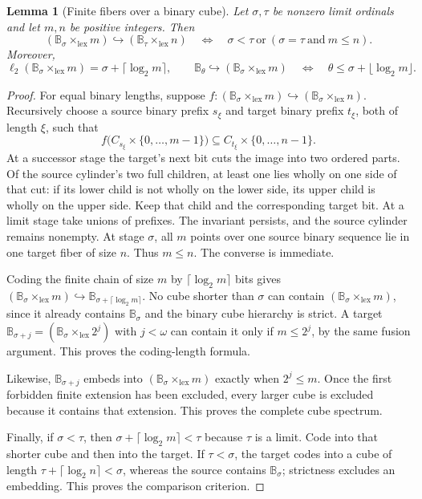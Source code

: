 \documentclass[11pt]{article}
\newtheorem{lemma}[lemma]{Lemma}
\theoremstyle{definition}
\theoremstyle{remark}
\newcommand{\B}{\mathbb B}
\newcommand{\lex}{\mathrm{lex}}
\newcommand{\bl}{\ell_2}
\newcommand{\emb}{\hookrightarrow}
\begin{document}
\begin{lemma}[Finite fibers over a binary cube]
\label{swo:cb:new:lem:finite-capacity}
Let $\sigma,\tau$ be nonzero limit ordinals and let $m,n$ be positive
integers.  Then
\[
 (\B_{\sigma}\times_{\lex}m)\emb (\B_{\tau}\times_{\lex}n)
 \quad\Longleftrightarrow\quad
 \sigma<\tau\ \text{or}\
      (\sigma=\tau\ \text{and}\ m\leq n).
\]
Moreover,
\[
 \bl(\B_{\sigma}\times_{\lex}m)=\sigma+\lceil\log_2m\rceil,
 \qquad
 \B_\theta\emb (\B_{\sigma}\times_{\lex}m)
 \quad\Longleftrightarrow\quad
 \theta\leq\sigma+\lfloor\log_2m\rfloor.
\]
\end{lemma}
\begin{proof}
For equal binary lengths, suppose
$f:(\B_{\sigma}\times_{\lex}m)\emb (\B_{\sigma}\times_{\lex}n)$.  Recursively choose a source
binary prefix $s_\xi$ and target binary prefix $t_\xi$, both of
length $\xi$, such that
\[
 f\bigl(C_{s_\xi}\times\{0,\ldots,m-1\}\bigr)
     \subseteq C_{t_\xi}\times\{0,\ldots,n-1\}.
\]
At a successor stage the target's next bit cuts the image into two
ordered parts.  Of the source cylinder's two full children, at least
one lies wholly on one side of that cut: if its lower child is not
wholly on the lower side, its upper child is wholly on the upper side.
Keep that child and the corresponding target bit.  At a limit stage
take unions of prefixes.  The invariant persists, and the source
cylinder remains nonempty.  At stage $\sigma$, all $m$ points over
one source binary sequence lie in one target fiber of size $n$.
Thus $m\leq n$.  The converse is immediate.

Coding the finite chain of size $m$ by
$\lceil\log_2m\rceil$ bits gives
$(\B_{\sigma}\times_{\lex}m)\emb\B_{\sigma+\lceil\log_2m\rceil}$.
No cube shorter than $\sigma$ can contain $(\B_{\sigma}\times_{\lex}m)$, since it
already contains $\B_\sigma$ and the binary cube hierarchy is
strict.  A target $\B_{\sigma+j}=(\B_{\sigma}\times_{\lex}2^j)$ with $j<\omega$
can contain it only if $m\leq2^j$, by the same fusion argument.
This proves the coding-length formula.

Likewise, $\B_{\sigma+j}$ embeds into $(\B_{\sigma}\times_{\lex}m)$ exactly when
$2^j\leq m$.  Once the first forbidden finite extension has been
excluded, every larger cube is excluded because it contains that
extension.  This proves the complete cube spectrum.

Finally, if $\sigma<\tau$, then
$\sigma+\lceil\log_2m\rceil<\tau$ because $\tau$ is a limit.
Code into that shorter cube and then into the target.  If
$\tau<\sigma$, the target codes into a cube of length
$\tau+\lceil\log_2n\rceil<\sigma$, whereas the source contains
$\B_\sigma$; strictness excludes an embedding.  This proves the
comparison criterion.
\end{proof}
\end{document}
